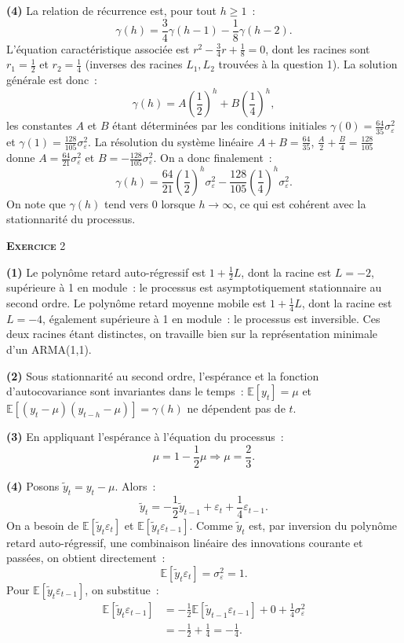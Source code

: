 \documentclass[11pt,a4paper,notitlepage]{article}
\newcommand{\exercice}[1]{\textsc{\textbf{Exercice}} #1}
\newcommand{\question}[1]{\textbf{(#1)}}
\begin{document}
\question{4} La relation de récurrence est, pour tout $h\geq 1$~:
\[
\gamma(h) = \frac{3}{4}\gamma(h-1) - \frac{1}{8}\gamma(h-2).
\]
L'équation caractéristique associée est $r^2 - \frac{3}{4}r +
\frac{1}{8} = 0$, dont les racines sont $r_1=\frac{1}{2}$ et
$r_2=\frac{1}{4}$ (inverses des racines $L_1, L_2$ trouvées à la
question 1). La solution générale est donc~:
\[
\gamma(h) = A\left(\frac{1}{2}\right)^h + B\left(\frac{1}{4}\right)^h,
\]
les constantes $A$ et $B$ étant déterminées par les conditions
initiales $\gamma(0) = \frac{64}{35}\sigma_{\varepsilon}^2$ et
$\gamma(1) = \frac{128}{105}\sigma_{\varepsilon}^2$. La résolution du
système linéaire $A+B=\frac{64}{35}$, $\frac{A}{2}+\frac{B}{4} =
\frac{128}{105}$ donne $A = \frac{64}{21}\sigma_{\varepsilon}^2$ et $B
= -\frac{128}{105}\sigma_{\varepsilon}^2$. On a donc finalement~:
\[
\gamma(h) = \frac{64}{21}\left(\frac{1}{2}\right)^h\sigma_{\varepsilon}^2
- \frac{128}{105}\left(\frac{1}{4}\right)^h\sigma_{\varepsilon}^2.
\]
On note que $\gamma(h)$ tend vers 0 lorsque $h\to\infty$, ce qui est
cohérent avec la stationnarité du processus.

\bigskip

\exercice{2}\newline

\question{1} Le polynôme retard auto-régressif est $1+\frac{1}{2}L$,
dont la racine est $L=-2$, supérieure à 1 en module~: le processus
est asymptotiquement stationnaire au second ordre. Le polynôme retard
moyenne mobile est $1+\frac{1}{4}L$, dont la racine est $L=-4$,
également supérieure à 1 en module~: le processus est inversible. Ces
deux racines étant distinctes, on travaille bien sur la représentation
minimale d'un ARMA(1,1).\newline

\question{2} Sous stationnarité au second ordre, l'espérance et la
fonction d'autocovariance sont invariantes dans le temps~: $\mathbb
E[y_t]=\mu$ et $\mathbb E[(y_t-\mu)(y_{t-h}-\mu)]=\gamma(h)$ ne
dépendent pas de $t$.\newline

\question{3} En appliquant l'espérance à l'équation du processus~:
\[
\mu = 1 - \frac{1}{2}\mu \Longrightarrow \mu = \frac{2}{3}.
\]
\newline

\question{4} Posons $\tilde y_t = y_t - \mu$. Alors~:
\[
\tilde y_t = -\frac{1}{2}\tilde y_{t-1} + \varepsilon_t + \frac{1}{4}\varepsilon_{t-1}.
\]
On a besoin de $\mathbb E[\tilde y_t \varepsilon_t]$ et $\mathbb
E[\tilde y_t \varepsilon_{t-1}]$. Comme $\tilde y_t$ est, par
inversion du polynôme retard auto-régressif, une combinaison linéaire
des innovations courante et passées, on obtient directement~:
\[
\mathbb E[\tilde y_t \varepsilon_t] = \sigma_{\varepsilon}^2 = 1.
\]
Pour $\mathbb E[\tilde y_t \varepsilon_{t-1}]$, on substitue~:
\[
\begin{split}
\mathbb E[\tilde y_t \varepsilon_{t-1}] &= -\frac{1}{2}\mathbb E[\tilde y_{t-1}\varepsilon_{t-1}] + 0 + \frac{1}{4}\sigma_{\varepsilon}^2\\
&= -\frac{1}{2} + \frac{1}{4} = -\frac{1}{4}.
\end{split}
\]
\end{document}
